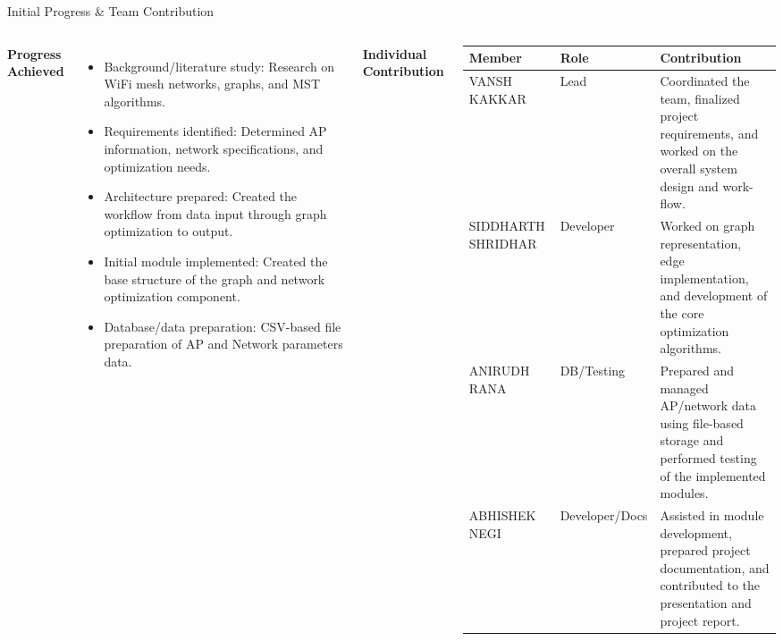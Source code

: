 \documentclass[aspectratio=169,11pt]{beamer}
\begin{document}
\begin{frame}{Initial Progress \& Team Contribution}
\begin{columns}[T,totalwidth=\textwidth]
\scriptsize
\textbf{\color{GEUBlue}Progress Achieved}
\begin{itemize}\itemsep1pt
\item Background/literature study: Research on WiFi mesh networks, graphs, and MST algorithms.
\item Requirements identified: Determined AP information, network specifications, and optimization needs.
\item Architecture prepared: Created the workflow from data input through graph optimization to output.
\item Initial module implemented: Created the base structure of the graph and network optimization component.
\item Database/data preparation: CSV-based file preparation of AP and Network parameters data.
\end{itemize}

\textbf{\color{GEUBlue}Individual Contribution}
\vspace{1mm}
\tiny
\renewcommand{\arraystretch}{1.08}
\begin{tabularx}{\textwidth}{@{}p{2.05cm}p{1.45cm}X@{}}
\toprule
Member & Role & Contribution\\
\midrule
VANSH KAKKAR & Lead & Coordinated the team, finalized project requirements, and worked on the overall system design and work-flow.\\
SIDDHARTH SHRIDHAR & Developer & Worked on graph representation, edge implementation, and development of the core optimization algorithms.\\
ANIRUDH RANA & DB/Testing & Prepared and managed AP/network data using file-based storage and performed testing of the implemented modules.\\
ABHISHEK NEGI & Developer/Docs & Assisted in module development, prepared project documentation, and contributed to the presentation and project report.\\
\bottomrule
\end{tabularx}
\end{columns}
\end{frame}
\end{document}
